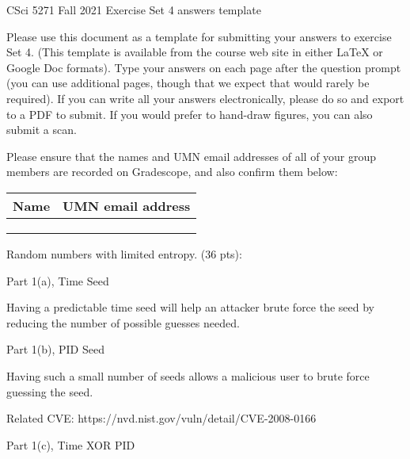 \documentclass[11pt]{article}
\begin{document}
\begin{center}
CSci 5271 Fall 2021 Exercise Set 4 answers template
\end{center}

Please use this document as a template for submitting your answers to
exercise Set 4. (This template is available from the course web site
in either LaTeX or Google Doc formats). Type your answers on each page
after the question prompt (you can use additional pages, though that
we expect that would rarely be required). If you can write all your
answers electronically, please do so and export to a PDF to submit.
If you would prefer to hand-draw figures, you can also submit a scan.

Please ensure that the names and UMN email addresses of all of your
group members are recorded on Gradescope, and also confirm them below:

\vspace{10pt}

\begin{tabular}{|p{2.6in}|p{2.6in}|}\hline
Name & UMN email address\\\hline
\vspace{20pt} & \\\hline
\vspace{20pt} & \\\hline
\vspace{20pt} & \\\hline
\end{tabular}

\vspace{10pt}

Random numbers with limited entropy. (36 pts):

Part 1(a), Time Seed

Having a predictable time seed will help an attacker brute force the seed by reducing the number of possible guesses needed.

\vspace{2in}

Part 1(b), PID Seed

Having such a small number of seeds allows a malicious user to brute force guessing the seed.

Related CVE: https://nvd.nist.gov/vuln/detail/CVE-2008-0166

\newpage

Part 1(c), Time XOR PID



\vspace{1.5in}
\end{document}
